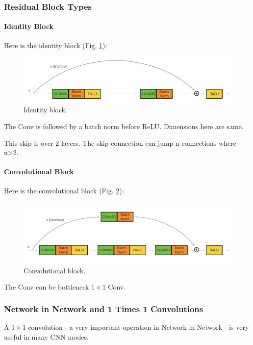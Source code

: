 \subsubsection{Residual Block Types}
\paragraph{Identity Block}
Here is the identity block (Fig. \ref{identity-block}):

\begin{figure}[!htbp]
    \centering
    \includegraphics[width=1.0\textwidth]{img/c4/identity-block.png}
    \caption{Identity block.}
    \label{identity-block}
\end{figure}

The Conv is followed by a batch norm before ReLU. Dimensions here are same.

This skip is over 2 layers. The skip connection can jump n connections where n>2.

\paragraph{Convolutional Block} Here is the convolutional block (Fig. \ref{convolutional-block}):

\begin{figure}[!htbp]
    \centering
    \includegraphics[width=1.0\textwidth]{img/c4/conv-block.png}
    \caption{Convolutional block.}
    \label{convolutional-block}
\end{figure}

The Conv can be bottleneck $1\times 1$ Conv.

\subsubsection{Network in Network and 1 Times 1 Convolutions}
A $1\times 1$ convolution - a very important operation in Network in Network \cite{lin2013network}- is very useful in many CNN modes.

